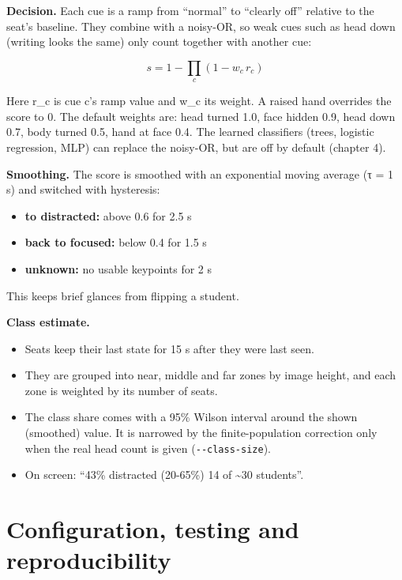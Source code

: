 \textbf{Decision.} Each cue is a ramp from ``normal'' to ``clearly off'' relative to the seat's baseline. They combine with a noisy-OR, so weak cues such as head down (writing looks the same) only count together with another cue:

\begin{equation}
s = 1 - \prod_{c} \left(1 - w_c \, r_c\right)
\end{equation}

Here r\_c is cue c's ramp value and w\_c its weight. A raised hand overrides the score to 0. The default weights are: head turned 1.0, face hidden 0.9, head down 0.7, body turned 0.5, hand at face 0.4. The learned classifiers (trees, logistic regression, MLP) can replace the noisy-OR, but are off by default (chapter 4).

\textbf{Smoothing.} The score is smoothed with an exponential moving average (τ = 1 s) and switched with hysteresis:

\begin{itemize}
\tightlist
\item
  \textbf{to distracted:} above 0.6 for 2.5 s
\item
  \textbf{back to focused:} below 0.4 for 1.5 s
\item
  \textbf{unknown:} no usable keypoints for 2 s
\end{itemize}

This keeps brief glances from flipping a student.

\textbf{Class estimate.}

\begin{itemize}
\tightlist
\item
  Seats keep their last state for 15 s after they were last seen.
\item
  They are grouped into near, middle and far zones by image height, and each zone is weighted by its number of seats.
\item
  The class share comes with a 95\% Wilson interval \cite{b16} around the shown (smoothed) value. It is narrowed by the finite-population correction only when the real head count is given (\texttt{-\/-class-size}).
\item
  On screen: ``43\% distracted (20-65\%) \textbar{} 14 of \textasciitilde30 students''.
\end{itemize}

\section{Configuration, testing and reproducibility}

